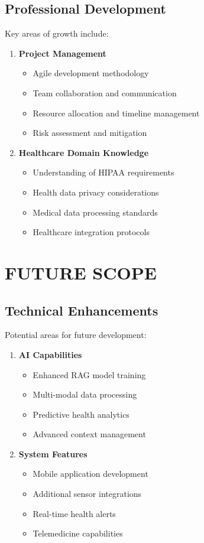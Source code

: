 \subsection{Professional Development}
Key areas of growth include:

\begin{enumerate}
    \item \textbf{Project Management}
    \begin{itemize}
        \item Agile development methodology
        \item Team collaboration and communication
        \item Resource allocation and timeline management
        \item Risk assessment and mitigation
    \end{itemize}

    \item \textbf{Healthcare Domain Knowledge}
    \begin{itemize}
        \item Understanding of HIPAA requirements
        \item Health data privacy considerations
        \item Medical data processing standards
        \item Healthcare integration protocols
    \end{itemize}
\end{enumerate}

\section{FUTURE SCOPE}

\subsection{Technical Enhancements}
Potential areas for future development:

\begin{enumerate}
    \item \textbf{AI Capabilities}
    \begin{itemize}
        \item Enhanced RAG model training
        \item Multi-modal data processing
        \item Predictive health analytics
        \item Advanced context management
    \end{itemize}

    \item \textbf{System Features}
    \begin{itemize}
        \item Mobile application development
        \item Additional sensor integrations
        \item Real-time health alerts
        \item Telemedicine capabilities
    \end{itemize}
\end{enumerate}

